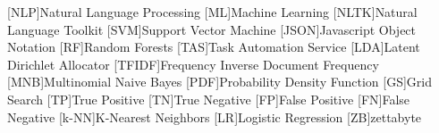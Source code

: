 \documentclass[a4paper,11pt,svgnames]{book}
\begin{document}
	[NLP]{Natural Language Processing}
	[ML]{Machine Learning}
	[NLTK]{Natural Language Toolkit}
	[SVM]{Support Vector Machine}
	[JSON]{Javascript Object Notation}
	[RF]{Random Forests}
	[TAS]{Task Automation Service}
	[LDA]{Latent Dirichlet Allocator}
	[TFIDF]{Frequency Inverse Document Frequency}
	[MNB]{Multinomial Naive Bayes}
	[PDF]{Probability Density Function}
	[GS]{Grid Search}
	[TP]{True Positive}
	[TN]{True Negative}
	[FP]{False Positive}
	[FN]{False Negative}
	[k-NN]{K-Nearest Neighbors}
	[LR]{Logistic Regression}
	[ZB]{zettabyte}
	\newcommand\litem[1]{\item{\bfseries #1 }}
	\renewcommand{\arraystretch}{1.5} %
	
	\newcommand\headcell[1]{%
	  \multicolumn{1}{|c|}{\cellcolor{DodgerBlue}\bfseries\sffamily\textcolor{white}{#1}}
	}
	
	
	
	
		
	
	
	
	
	
	
	
	\pagestyle{fancy}
	\fancyhf{}
	\fancyhead[RO]{\sffamily \slshape \rightmark}
	\fancyhead[LE]{\sffamily \slshape \leftmark}
	\fancyfoot[OR,EL]{\rmfamily \thepage} %
	
	
	
	
	
	
	
	
	
	\appendix
	
	\nocite{*}
	
	{
	\small
	
	}
	
\end{document}
